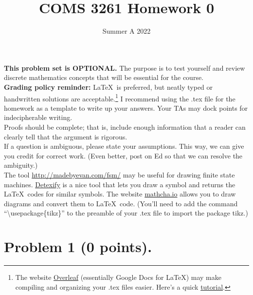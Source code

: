 \documentclass[letterpaper,11pt,twoside]{article}
\title{COMS 3261 Homework 0}
\date{Summer A 2022}
\theoremstyle{plain}
\theoremstyle{definition}
\theoremstyle{remark}
\theoremstyle{restate}
\begin{document}
\maketitle

\textbf{This problem set is OPTIONAL. } The purpose is to test yourself and review discrete mathematics concepts that will be essential for the course. \\


\textbf{Grading policy reminder:} \LaTeX~is preferred, but neatly typed or handwritten solutions are acceptable.\footnote{The website \href{https://www.overleaf.com/}{Overleaf} (essentially Google Docs for LaTeX) may make compiling and organizing your .tex files easier. Here's a quick \href{https://www.overleaf.com/learn/latex/Learn_LaTeX_in_30_minutes}{tutorial}.} I recommend using the .tex file for the homework as a template to write up your answers. Your TAs may dock points for indecipherable writing.\\

Proofs should be complete; that is, include enough information that a reader can clearly tell that the argument is rigorous. \\

If a question is ambiguous, please state your assumptions. This way, we can give you credit for correct work. (Even better, post on Ed so that we can resolve the ambiguity.) \\

The tool \url{http://madebyevan.com/fsm/} may be useful for drawing finite state machines. \href{https://detexify.kirelabs.org/classify.html}{Detexify} is a nice tool that lets you draw a symbol and returns the \LaTeX~codes for similar symbols. The website \href{https://www.mathcha.io/}{mathcha.io} allows you to draw diagrams and convert them to \LaTeX~code. (You'll need to add the command ``\textbackslash usepackage\{tikz\}'' to the preamble of your .tex file to import the package tikz.)



\clearpage
\section{
    Problem 1 (0 points).
}
    
\end{document}

